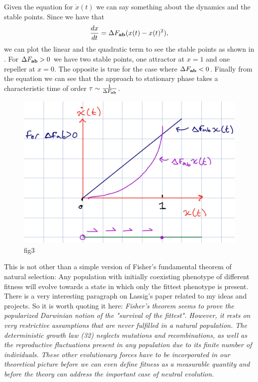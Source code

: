 Given the equation for $\dot{x}(t)$ we can say something about the dynamics and
the stable points. Since we have that
\begin{equation}
  {d{x} \over dt} = \Delta F_{\mathbf{ab}} (x(t) - x(t)^2),
\end{equation}
we can plot the linear and the quadratic term to see the stable points as shown
in . For $\Delta F_{\mathbf{ab}} > 0$ we have two stable points, one
attractor at $x = 1$ and one repeller at $x = 0$. The opposite is true for the
case where $\Delta F_{\mathbf{ab}} < 0$. Finally from the equation we can see that the approach to
stationary phase takes a characteristic time of order $\tau \sim {1 \over \Delta F_{\mathbf{ab}}}$.

\begin{figure}[h!]
	\centering \includegraphics[scale=0.5]{../fig/lassig_2007/phase_portrait.png}
	\caption{fig3}
  \label{fig_phase_portrait}
\end{figure}

This is not other than a simple version of Fisher's fundamental theorem of
natural selection: Any population with initially coexisting phenotype of
different fitness will evolve towards a state in which only the fittest
phenotype is present. There is a very interesting paragraph on Lassig's paper
related to my ideas and projects. So it is worth quoting it here:
{\it Fisher's theorem seems to prove the popularized Darwinian notion of the
"survival of the fittest". However, it rests on very restrictive assumptions
that are never fulfilled in a natural population. The deterministic growth law
(32) neglects mutations and recombinations, as well as the reproductive
fluctuations present in any population due to its finite number of individuals.
These other evolutionary forces have to be incorporated in our theoretical
picture before we can even define fitness as a measurable quantity and before
the theory can address the important case of neutral evolution.}

